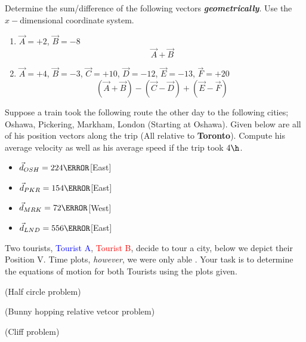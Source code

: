 \documentclass[12pt]{article} %
\begin{document}
\begin{qstn}[5]
	Determine the sum/difference of the following vectors \textbf{\emph{geometrically}}. Use the $x-$dimensional coordinate system.
	\begin{enumerate}[label=(\alph*)]
		\item $\vec A = +2$, $\vec B = -8$ $$\vec A + \vec B$$
		\vspace*{3cm}
		\item $\vec A = +4$, $\vec B = -3$, $\vec C = +10$, $\vec D = -12$, $\vec E = -13$, $\vec F = +20$   $$(\vec A + \vec B) - (\vec C - \vec D) + (\vec E - \vec F)$$

	\end{enumerate}
\end{qstn}




\begin{qstn}[6]
	Suppose a train took the following route the other day to the following cities; Oshawa, Pickering, Markham, London (Starting at Oshawa). Given below are all of his position vectors along the trip (All relative to \textbf{Toronto}). Compute his average velocity as well as his average speed if the trip took $4 \h$.
	\begin{itemize}
	\item $\vec d_{OSH} = 224\km$[East]
	\item $\vec d_{PKR} = 154\km$[East]
	\item $\vec d_{MRK} = 72\km$[West]
	\item $\vec d_{LND} = 556\km$[East]
	\end{itemize}

\end{qstn}

\begin{qstn}[8]
	Two tourists, \textcolor{blue}{Tourist A}, \textcolor{red}{Tourist B}, decide to tour a city, below we depict their Position V. Time plots, \emph{however}, we were only able . Your task is to determine the equations of motion for both Tourists using the plots given.
	\begin{center}
		\end{center}

\end{qstn}



\begin{qstn}[9]
(Half circle problem)

\end{qstn}

\begin{qstn}[10]
(Bunny hopping relative vetcor problem)
\end{qstn}

\begin{qstn}[11]
(Cliff problem)
\end{qstn}
\end{document}

